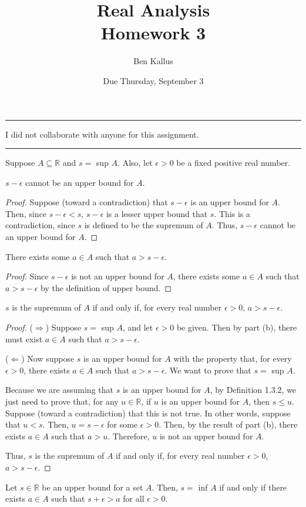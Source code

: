 \documentclass[12pt]{article}
\title{Real Analysis \\ Homework 3}
\author{Ben Kallus}
\date{Due Thursday, September 3}
\begin{document}
\maketitle

\hrule
\bigskip

  I did not collaborate with anyone for this assignment.

\bigskip
\hrule

\bigskip
{} Suppose $A \subseteq \mathbb R$ and $s =$ sup $A$. Also, let $\epsilon > 0$ be a fixed positive real number.

\medskip
{} $s - \epsilon$ cannot be an upper bound for $A$.
\begin{proof}
    Suppose (toward a contradiction) that $s- \epsilon$ is an upper bound for $A$. Then, since $s - \epsilon < s$, $s - \epsilon$ is a lesser upper bound that $s$. This is a contradiction, since $s$ is defined to be the supremum of $A$. Thus, $s - \epsilon$ cannot be an upper bound for $A$.
\end{proof}

\medskip
{} There exists some $a \in A$ such that $a > s - \epsilon$.
\begin{proof}
    Since $s - \epsilon$ is not an upper bound for $A$, there exists some $a \in A$ such that $a > s - \epsilon$ by the definition of upper bound.
\end{proof}

\medskip
{} $s$ is the supremum of $A$ if and only if, for every real number $\epsilon > 0$, $a > s - \epsilon$.
\begin{proof}
    ($\Rightarrow$) Suppose $s =$ sup $A$, and let $\epsilon > 0$ be given. Then by part (b), there must exist $a \in A$ such that $a > s - \epsilon$.
    
    ($\Leftarrow$) Now suppose $s$ is an upper bound for $A$ with the property that, for every $\epsilon > 0$, there exists $a \in A$ such that $a > s - \epsilon$. We want to prove that $s =$ sup $A$.
    
    Because we are assuming that $s$ is an upper bound for $A$, by Definition 1.3.2, we just need to prove that, for any $u \in \mathbb R$, if $u$ is an upper bound for $A$, then $s \leq u$. Suppose (toward a contradiction) that this is not true. In other words, suppose that $u < s$. Then, $u = s - \epsilon$ for some $\epsilon > 0$. Then, by the result of part (b), there exists $a \in A$ such that $a > u$. Therefore, $u$ is not an upper bound for $A$.
    
    Thus, $s$ is the supremum of $A$ if and only if, for every real number $\epsilon > 0$, $a > s - \epsilon$.
\end{proof}


\newpage
{}

Let $s \in \mathbb R$ be an upper bound for a set $A$. Then, $s =$ inf $A$ if and only if there exists $a \in A$ such that $s + \epsilon > a$ for all $\epsilon > 0$.
\end{document}
